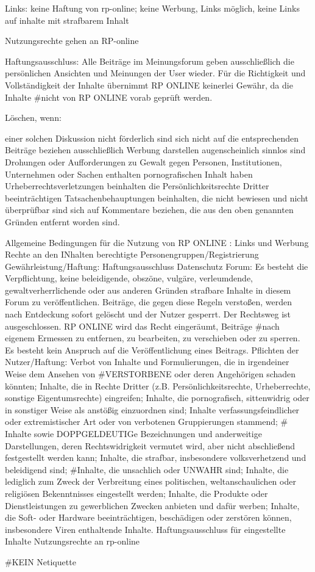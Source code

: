  Links: keine Haftung von rp-online; keine Werbung, Links möglich, keine Links auf inhalte mit strafbarem Inhalt
 
 Nutzungsrechte gehen an RP-online
 
 Haftungsausschluss: Alle Beiträge im Meinungsforum geben ausschließlich die persönlichen Ansichten und Meinungen der User wieder. Für die Richtigkeit und Vollständigkeit der Inhalte übernimmt RP ONLINE keinerlei Gewähr, da die Inhalte #nicht von RP ONLINE vorab geprüft werden.
 
 Löschen, wenn: 
 
    einer solchen Diskussion nicht förderlich sind
    sich nicht auf die entsprechenden Beiträge beziehen
    ausschließlich Werbung darstellen
    augenscheinlich sinnlos sind
    Drohungen oder Aufforderungen zu Gewalt gegen Personen, Institutionen, Unternehmen oder Sachen enthalten
    pornografischen Inhalt haben
    Urheberrechtsverletzungen beinhalten
    die Persönlichkeitsrechte Dritter beeinträchtigen
    Tatsachenbehauptungen beinhalten, die nicht bewiesen und nicht überprüfbar sind
    sich auf Kommentare beziehen, die aus den oben genannten Gründen entfernt worden sind.


Allgemeine Bedingungen für die Nutzung von RP ONLINE :
	Links und Werbung
	Rechte an den INhalten
	berechtigte Personengruppen/Registrierung
	Gewährleistung/Haftung: Haftungsausschluss
	Datenschutz
	Forum: Es besteht die Verpflichtung, keine beleidigende, obszöne, vulgäre, verleumdende, gewaltverherrlichende oder aus anderen Gründen strafbare Inhalte in diesem Forum zu veröffentlichen. Beiträge, die gegen diese Regeln verstoßen, werden nach Entdeckung sofort gelöscht und der Nutzer gesperrt. Der Rechtsweg ist ausgeschlossen. RP ONLINE wird das Recht eingeräumt, Beiträge #nach eigenem Ermessen zu entfernen, zu bearbeiten, zu verschieben oder zu sperren. Es besteht kein Anspruch auf die Veröffentlichung eines Beitrags. 
	Pflichten der Nutzer/Haftung: Verbot von
	Inhalte und Formulierungen, die in irgendeiner Weise dem Ansehen von #VERSTORBENE oder deren Angehörigen schaden könnten;
    Inhalte, die in Rechte Dritter (z.B. Persönlichkeitsrechte, Urheberrechte, sonstige Eigentumsrechte) eingreifen;
    Inhalte, die pornografisch, sittenwidrig oder in sonstiger Weise als anstößig einzuordnen sind;
    Inhalte verfassungsfeindlicher oder extremistischer Art oder von verbotenen Gruppierungen stammend;
  #  Inhalte sowie DOPPGELDEUTIGe Bezeichnungen und anderweitige Darstellungen, deren Rechtswidrigkeit vermutet wird, aber nicht abschließend festgestellt werden kann;
    Inhalte, die strafbar, insbesondere volksverhetzend und beleidigend sind;
    #Inhalte, die unsachlich oder UNWAHR sind;
    Inhalte, die lediglich zum Zweck der Verbreitung eines politischen, weltanschaulichen oder religiösen Bekenntnisses eingestellt werden;
    Inhalte, die Produkte oder Dienstleistungen zu gewerblichen Zwecken anbieten und dafür werben;
    Inhalte, die Soft- oder Hardware beeinträchtigen, beschädigen oder zerstören können, insbesondere Viren enthaltende Inhalte.
    Haftungsausschluss für eingestellte Inhalte
    Nutzungsrechte an rp-online

#KEIN Netiquette









